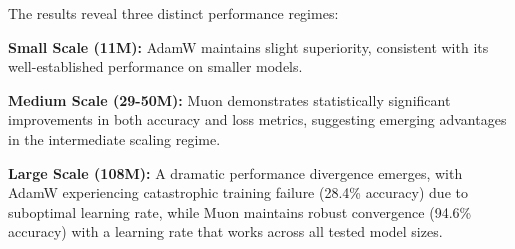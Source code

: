 \documentclass[11pt,a4paper]{article}
\begin{document}
\begin{table}[H]
\centering
\caption{Scaling experiment results showing mean ± standard deviation across two random seeds. Statistical significance assessed via independent t-tests.}
\label{tab:scaling_results}
\end{table}

The results reveal three distinct performance regimes:

\textbf{Small Scale (11M):} AdamW maintains slight superiority, consistent with its well-established performance on smaller models.

\textbf{Medium Scale (29-50M):} Muon demonstrates statistically significant improvements in both accuracy and loss metrics, suggesting emerging advantages in the intermediate scaling regime.

\textbf{Large Scale (108M):} A dramatic performance divergence emerges, with AdamW experiencing catastrophic training failure (28.4\% accuracy) due to suboptimal learning rate, while Muon maintains robust convergence (94.6\% accuracy) with a learning rate that works across all tested model sizes.
\end{document}
